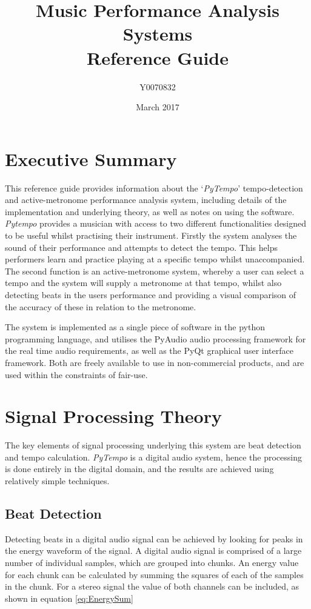 \documentclass[hidelinks,12pt]{article}
\date{March 2017}
\title{Music Performance Analysis Systems\\\large{Reference Guide}}
\author{Y0070832}
\begin{document}
\maketitle
\tableofcontents
\newpage
\section{Executive Summary}
This reference guide provides information about the `\textit{PyTempo}' tempo-detection and active-metronome performance analysis system, including details of the implementation and underlying theory, as well as notes on using the software. \textit{Pytempo} provides a musician with access to two different functionalities designed to be useful whilst practising their instrument. Firstly the system analyses the sound of their performance and attempts to detect the tempo. This helps performers learn and practice playing at a specific tempo whilst unaccompanied. The second function is an active-metronome system, whereby a user can select a tempo and the system will supply a metronome at that tempo, whilst also detecting beats in the users performance and providing a visual comparison of the accuracy of these in relation to the metronome.

The system is implemented as a single piece of software in the python programming language, and utilises the PyAudio audio processing framework for the real time audio requirements, as well as the PyQt graphical user interface framework. Both are freely available to use in non-commercial products, and are used within the constraints of fair-use.
\section{Signal Processing Theory} \label{Processing}
The key elements of signal processing underlying this system are beat detection and tempo calculation. \textit{PyTempo} is a digital audio system, hence the processing is done entirely in the digital domain, and the results are achieved using relatively simple techniques.
\subsection{Beat Detection} \label{BeatDetection}
Detecting beats in a digital audio signal can be achieved by looking for peaks in the energy waveform of the signal. A digital audio signal is comprised of a large number of individual samples, which are grouped into chunks. An energy value for each chunk can be calculated by summing the squares of each of the samples in the chunk. For a stereo signal the value of both channels can be included, as shown in equation \ref{eq:EnergySum}
\end{document}
